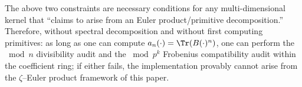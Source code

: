 \begin{remark}\label{rem:multi-dim-self-audit}
The above two constraints are necessary conditions for any multi-dimensional kernel that ``claims to arise from an Euler product/primitive decomposition.''
Therefore, without spectral decomposition and without first computing primitives: as long as one can compute \(a_n(\cdot)=\Tr(B(\cdot)^n)\), one can perform the \(\bmod n\) divisibility audit and the \(\bmod p^k\) Frobenius compatibility audit within the coefficient ring; if either fails, the implementation provably cannot arise from the \(\zeta\)--Euler product framework of this paper.
\end{remark}
